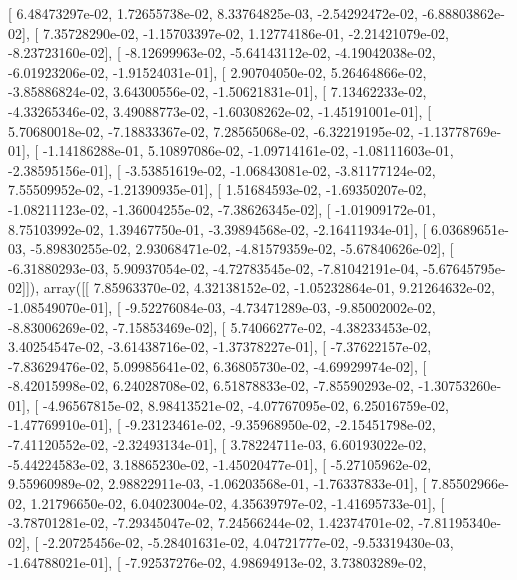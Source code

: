 \documentclass{article}
\begin{document}
       [  6.48473297e-02,   1.72655738e-02,   8.33764825e-03,
         -2.54292472e-02,  -6.88803862e-02],
       [  7.35728290e-02,  -1.15703397e-02,   1.12774186e-01,
         -2.21421079e-02,  -8.23723160e-02],
       [ -8.12699963e-02,  -5.64143112e-02,  -4.19042038e-02,
         -6.01923206e-02,  -1.91524031e-01],
       [  2.90704050e-02,   5.26464866e-02,  -3.85886824e-02,
          3.64300556e-02,  -1.50621831e-01],
       [  7.13462233e-02,  -4.33265346e-02,   3.49088773e-02,
         -1.60308262e-02,  -1.45191001e-01],
       [  5.70680018e-02,  -7.18833367e-02,   7.28565068e-02,
         -6.32219195e-02,  -1.13778769e-01],
       [ -1.14186288e-01,   5.10897086e-02,  -1.09714161e-02,
         -1.08111603e-01,  -2.38595156e-01],
       [ -3.53851619e-02,  -1.06843081e-02,  -3.81177124e-02,
          7.55509952e-02,  -1.21390935e-01],
       [  1.51684593e-02,  -1.69350207e-02,  -1.08211123e-02,
         -1.36004255e-02,  -7.38626345e-02],
       [ -1.01909172e-01,   8.75103992e-02,   1.39467750e-01,
         -3.39894568e-02,  -2.16411934e-01],
       [  6.03689651e-03,  -5.89830255e-02,   2.93068471e-02,
         -4.81579359e-02,  -5.67840626e-02],
       [ -6.31880293e-03,   5.90937054e-02,  -4.72783545e-02,
         -7.81042191e-04,  -5.67645795e-02]]), array([[  7.85963370e-02,   4.32138152e-02,  -1.05232864e-01,
          9.21264632e-02,  -1.08549070e-01],
       [ -9.52276084e-03,  -4.73471289e-03,  -9.85002002e-02,
         -8.83006269e-02,  -7.15853469e-02],
       [  5.74066277e-02,  -4.38233453e-02,   3.40254547e-02,
         -3.61438716e-02,  -1.37378227e-01],
       [ -7.37622157e-02,  -7.83629476e-02,   5.09985641e-02,
          6.36805730e-02,  -4.69929974e-02],
       [ -8.42015998e-02,   6.24028708e-02,   6.51878833e-02,
         -7.85590293e-02,  -1.30753260e-01],
       [ -4.96567815e-02,   8.98413521e-02,  -4.07767095e-02,
          6.25016759e-02,  -1.47769910e-01],
       [ -9.23123461e-02,  -9.35968950e-02,  -2.15451798e-02,
         -7.41120552e-02,  -2.32493134e-01],
       [  3.78224711e-03,   6.60193022e-02,  -5.44224583e-02,
          3.18865230e-02,  -1.45020477e-01],
       [ -5.27105962e-02,   9.55960989e-02,   2.98822911e-03,
         -1.06203568e-01,  -1.76337833e-01],
       [  7.85502966e-02,   1.21796650e-02,   6.04023004e-02,
          4.35639797e-02,  -1.41695733e-01],
       [ -3.78701281e-02,  -7.29345047e-02,   7.24566244e-02,
          1.42374701e-02,  -7.81195340e-02],
       [ -2.20725456e-02,  -5.28401631e-02,   4.04721777e-02,
         -9.53319430e-03,  -1.64788021e-01],
       [ -7.92537276e-02,   4.98694913e-02,   3.73803289e-02,
\end{document}
